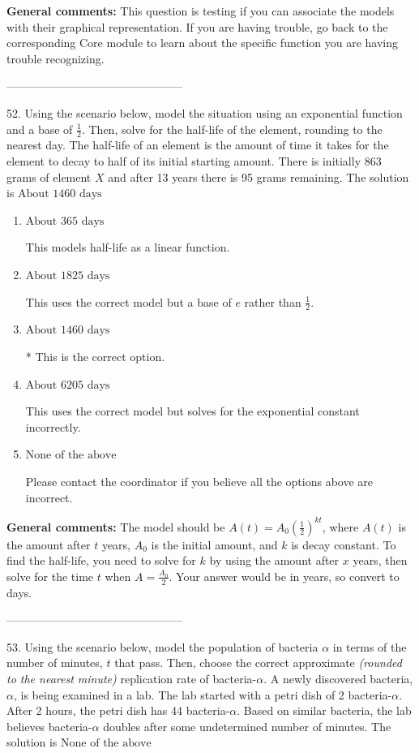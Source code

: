 \documentclass{extbook}[14pt]
\begin{document}
\textbf{General comments:} This question is testing if you can associate the models with their graphical representation. If you are having trouble, go back to the corresponding Core module to learn about the specific function you are having trouble recognizing.

-----------------------------------------------

52. Using the scenario below, model the situation using an exponential function and a base of $\frac{1}{2}$. Then, solve for the half-life of the element, rounding to the nearest day.
The half-life of an element is the amount of time it takes for the element to decay to half of its initial starting amount. There is initially 863 grams of element $X$ and after 13 years there is 95 grams remaining. 
The solution is $ \text{About } 1460 \text{ days} $ 

\begin{enumerate}[label=\Alph*.] 
\item $ \text{About } 365 \text{ days} $ 

 This models half-life as a linear function. 
\item $ \text{About } 1825 \text{ days} $ 

 This uses the correct model but a base of $e$ rather than $\frac{1}{2}$. 
\item $ \text{About } 1460 \text{ days} $ 

 * This is the correct option. 
\item $ \text{About } 6205 \text{ days} $ 

 This uses the correct model but solves for the exponential constant incorrectly. 
\item $ \text{None of the above} $ 

 Please contact the coordinator if you believe all the options above are incorrect. 
\end{enumerate} 
 
\textbf{General comments:} The model should be $A(t) = A_0 (\frac{1}{2})^{kt}$, where $A(t)$ is the amount after $t$ years, $A_0$ is the initial amount, and $k$ is decay constant. To find the half-life, you need to solve for $k$ by using the amount after $x$ years, then solve for the time $t$ when $A = \frac{A_0}{2}$. Your answer would be in years, so convert to days.

-----------------------------------------------

53. Using the scenario below, model the population of bacteria $\alpha$ in terms of the number of minutes, $t$ that pass. Then, choose the correct approximate \textit{(rounded to the nearest minute)} replication rate of bacteria-$\alpha$.
A newly discovered bacteria, $\alpha$, is being examined in a lab. The lab started with a petri dish of 2 bacteria-$\alpha$. After 2 hours, the petri dish has 44 bacteria-$\alpha$. Based on similar bacteria, the lab believes bacteria-$\alpha$ doubles after some undetermined number of minutes. 
The solution is $ \text{None of the above} $ 
\end{document}
